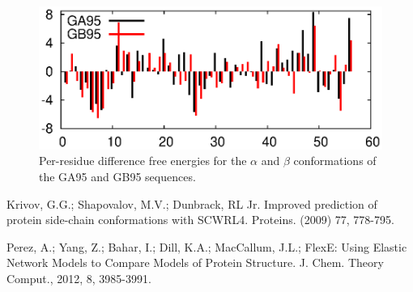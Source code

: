 \documentclass[12pt]{article}
\begin{document}
\begin{figure}
\begin{center}
\includegraphics[width=4.3 in]{dg.eps}
\end{center}
\caption{Per-residue difference free energies for the $\alpha$ and $\beta$ conformations of the GA95 and GB95
        sequences.}
\label{fig:DeltaG}
\end{figure}


\begin{thebibliography}{99}

Krivov, G.G.; Shapovalov, M.V.; Dunbrack, RL Jr. Improved prediction of protein side-chain conformations with SCWRL4.
Proteins. (2009) 77, 778-795.

Perez, A.; Yang, Z.; Bahar, I.; Dill, K.A.; MacCallum, J.L.; FlexE: Using Elastic Network Models to Compare Models of Protein Structure. J. Chem. Theory Comput., 2012, 8, 3985-3991.

\end{thebibliography}

\end{document}

